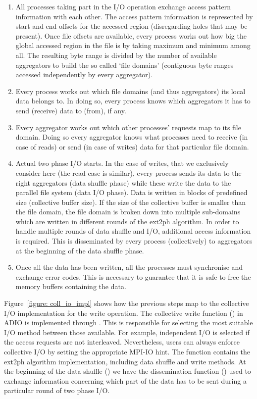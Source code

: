 \begin{enumerate}
\item All processes taking part in the I/O operation exchange access pattern information with each other. The access pattern information is represented by start and end offsets for the accessed region (disregarding holes that may be present). Once file offsets are available, every process works out how big the global accessed region in the file is by taking maximum and minimum among all. The resulting byte range is divided by the number of available aggregators to build the so called `file domains' (contiguous byte ranges accessed independently by every aggregator).
\item Every process works out which file domains (and thus aggregators) its local data belongs to. In doing so, every process knows which aggregators it has to send (receive) data to (from), if any.
\item Every aggregator works out which other processes' requests map to its file domain. Doing so every aggregator knows what processes need to receive (in case of reads) or send (in case of writes) data for that particular file domain.
\item Actual two phase I/O starts. In the case of writes, that we exclusively consider here (the read case is similar), every process sends its data to the right aggregators (data shuffle phase) while these write the data to the parallel file system (data I/O phase). Data is written in blocks of predefined size (collective buffer size). If the size of the collective buffer is smaller than the file domain, the file domain is broken down into multiple sub-domains which are written in different rounds of the ext2ph algorithm. In order to handle multiple rounds of data shuffle and I/O, additional access information is required. This is disseminated by every process (collectively) to aggregators at the beginning of the data shuffle phase.
\item Once all the data has been written, all the processes must synchronise and exchange error codes. This is necessary to guarantee that it is safe to free the memory buffers containing the data.
\end{enumerate}
Figure~\ref{figure: coll_io_impl} shows how the previous steps map to the collective I/O implementation for the write operation. The collective write function () in ADIO is implemented through . This is responsible for selecting the most suitable I/O method between those available. For example, independent I/O is selected if the access requests are not interleaved. Nevertheless, users can always enforce collective I/O by setting the appropriate MPI-IO hint. The  function contains the ext2ph algorithm implementation, including data shuffle and write methods. At the beginning of the data shuffle () we have the dissemination function () used to exchange information concerning which part of the data has to be sent during a particular round of two phase I/O. 

